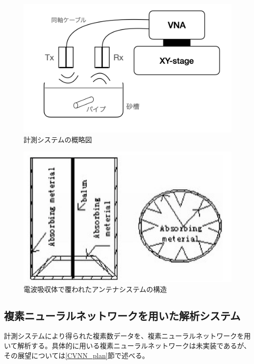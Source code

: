 \documentclass[11pt,a4paper,uplatex,draft]{ujarticle}
\begin{document}
    \begin{figure}[hbtp]
      \centering
      \includegraphics[keepaspectratio, width=130mm]{Images/XYstage_configuration.png}
      \caption{計測システムの概略図}\label{fig:XYstage_configuration}
    \end{figure}

    \begin{figure}[hbtp]
      \centering
      \includegraphics[keepaspectratio, width=130mm]{Images/absorbing_material.png}
      \caption{電波吸収体で覆われたアンテナシステムの構造\cite{absorbing_material}}\label{fig:absorbing_material}
    \end{figure}

  \newpage

  \subsection{複素ニューラルネットワークを用いた解析システム}

    計測システムにより得られた複素数データを、複素ニューラルネットワークを用いて解析する。具体的に用いる複素ニューラルネットワークは未実装であるが、
    その展望については\ref{CVNN_plan}節で述べる。
\end{document}
